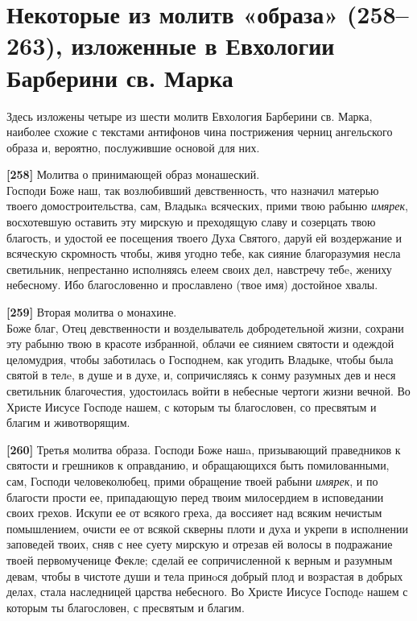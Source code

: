 \chapter{Некоторые из молитв «образа» (258--263), изложенные в Евхологии Барберини св. Марка}\label{ux43dux435ux43aux43eux442ux43eux440ux44bux435-ux438ux437-ux448ux435ux441ux442ux438-ux43cux43eux43bux438ux442ux432-ux43e-ux43cux43eux43dux430ux445ux438ux43dux435-258263-ux438ux437ux43bux43eux436ux435ux43dux43dux44bux435-ux432-ux435ux432ux445ux43eux43bux43eux433ux438ux438-ux431ux430ux440ux431ux435ux440ux438ux43dux438-ux441ux432.-ux43cux430ux440ux43aux430}

Здесь изложены четыре из шести молитв Евхология Барберини св. Марка\cite[С.219–222]{barberini.evhologiy.2011}, наиболее схожие с текстами антифонов чина пострижения черниц ангельского образа и, вероятно, послужившие основой для них.

\textbf{{[}258{]}} Молитва о принимающей образ монашеский.\\
Господи Боже наш, так возлюбивший девственность, что назначил матерью твоего домостроительства, сам, Владыкa всяческих, прими твою рабыню \emph{имярек}, восхотевшую оставить эту мирскую и преходящую славу и созерцать твою благость, и удостой ее посещения твоего Духа Святого, даруй ей воздержание и всяческую скромность чтобы, живя угодно тебе, как сияние благоразумия несла светильник, непрестанно исполняясь елеем своих дел, навстречу тебe, жениху небесному. Ибо благословенно и прославлено (твое имя) достойное хвалы.

\textbf{{[}259{]}} Вторая молитва о монахине.\\
Боже благ, Отец девственности и возделыватель добродетельной жизни, сохрани эту рабыню твою в красоте избранной, облачи ее сиянием святости и одеждой целомудрия, чтобы заботилась о Господнем, как угодить Владыке, чтобы была святой в телe, в душе и в духе, и, сопричисляясь к сонму разумных дев и неся светильник благочестия, удостоилась войти в небесные чертоги жизни вечной. Во Христе Иисусе Господе нашем, с которым ты благословен, со пресвятым и благим и животворящим.

\textbf{{[}260{]}} Третья молитва образа.
Господи Боже нашa, призывающий праведников к святости и грешников к оправданию, и обращающихся быть помилованными, сам, Господи человеколюбец, прими обращение твоей рабыни \emph{имярек}, и по благости прости ее, припадающую перед твоим милосердием в исповедании своих грехов. Искупи ее от всякого греха, да воссияет над всяким нечистым помышлением, очисти ее от всякой скверны плоти и духа и укрепи в исполнении заповедей твоих, сняв с нее суету мирскую и отрезав ей волосы в подражание твоей первомученице Фекле; сделай ее сопричисленной к верным и разумным девам, чтобы в чистоте души и тела принoся добрый плод и возрастая в добрых делах, стала наследницей царства небесного. Во Христе Иисусе Господe нашем с которым ты благословен, с пресвятым и благим.


